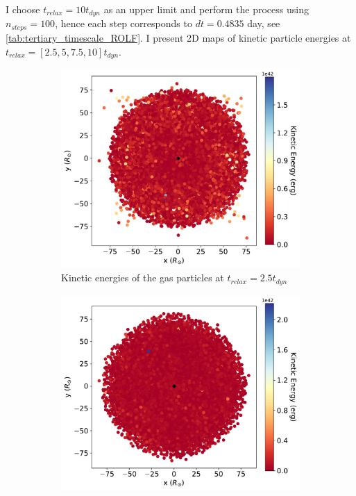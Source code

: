 I choose  $t_{relax} = 10 t_{dyn}$ as an upper limit and perform the process using $n_{steps} = 100$, hence each step corresponds to $dt=0.4835$ day, see \cref{tab:tertiary_timescale_ROLF}. I present 2D maps of kinetic particle energies at $t_{relax} =[2.5, 5, 7.5, 10] t_{dyn}$.
\begin{figure}[H]
    \centering
    \begin{subfigure}[b]{0.49\textwidth}
        \centering
        \includegraphics[width=\textwidth]{Thesis/graphs/tertiary_kin_energy_relaxed_2_5_tdyn.pdf}   
        \caption{Kinetic energies of the gas particles at  $t_{relax} = 2.5t_{dyn}$}%
    \end{subfigure}
    \hfill
    \begin{subfigure}[b]{0.49\textwidth}  
        \centering 
        \includegraphics[width=\textwidth]{Thesis/graphs/tertiary_kin_energy_relaxed_5_tdyn.pdf}

\end{subfigure}
\end{figure}
